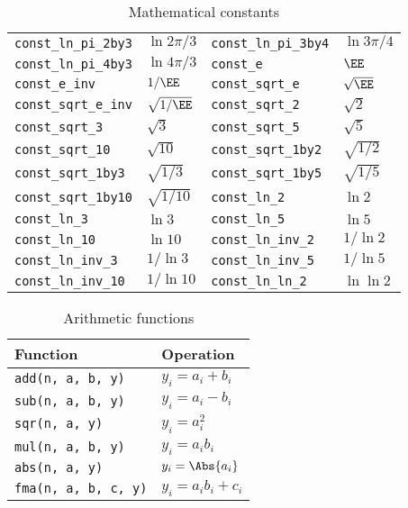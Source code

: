 \begin{table}
\begin{tabularx}{\textwidth}{p{1.2in}Lp{1.2in}L}
    \texttt{const\_ln\_pi\_2by3}   & $\ln{2\pi/3}$   &
    \texttt{const\_ln\_pi\_3by4}   & $\ln{3\pi/4}$   \\
    \texttt{const\_ln\_pi\_4by3}   & $\ln{4\pi/3}$   &
    \texttt{const\_e}              & $\EE$           \\
    \texttt{const\_e\_inv}         & $1/\EE$         &
    \texttt{const\_sqrt\_e}        & $\sqrt{\EE}$    \\
    \texttt{const\_sqrt\_e\_inv}   & $\sqrt{1/\EE}$  &
    \texttt{const\_sqrt\_2}        & $\sqrt{2}$      \\
    \texttt{const\_sqrt\_3}        & $\sqrt{3}$      &
    \texttt{const\_sqrt\_5}        & $\sqrt{5}$      \\
    \texttt{const\_sqrt\_10}       & $\sqrt{10}$     &
    \texttt{const\_sqrt\_1by2}     & $\sqrt{1/2}$    \\
    \texttt{const\_sqrt\_1by3}     & $\sqrt{1/3}$    &
    \texttt{const\_sqrt\_1by5}     & $\sqrt{1/5}$    \\
    \texttt{const\_sqrt\_1by10}    & $\sqrt{1/10}$   &
    \texttt{const\_ln\_2}          & $\ln{2}$        \\
    \texttt{const\_ln\_3}          & $\ln{3}$        &
    \texttt{const\_ln\_5}          & $\ln{5}$        \\
    \texttt{const\_ln\_10}         & $\ln{10}$       &
    \texttt{const\_ln\_inv\_2}     & $1/\ln{2}$      \\
    \texttt{const\_ln\_inv\_3}     & $1/\ln{3}$      &
    \texttt{const\_ln\_inv\_5}     & $1/\ln{5}$      \\
    \texttt{const\_ln\_inv\_10}    & $1/\ln{10}$     &
    \texttt{const\_ln\_ln\_2}      & $\ln\ln{2}$     \\
    \bottomrule
  \end{tabularx}
  \caption{Mathematical constants}
  \label{tab:Mathematical constants}
\end{table}

\begin{table}
  \begin{tabularx}{\textwidth}{LL}
    \toprule
    Function & Operation \\
    \midrule
    \texttt{add(n, a, b, y)}    & $y_i = a_i + b_i$     \\
    \texttt{sub(n, a, b, y)}    & $y_i = a_i - b_i$     \\
    \texttt{sqr(n, a, y)}       & $y_i = a_i^2$         \\
    \texttt{mul(n, a, b, y)}    & $y_i = a_i b_i$       \\
    \texttt{abs(n, a, y)}       & $y_i = \Abs{a_i}$     \\
    \texttt{fma(n, a, b, c, y)} & $y_i = a_i b_i + c_i$ \\
    \bottomrule
  \end{tabularx}
  \caption{Arithmetic functions}
  \label{tab:Arithmetic functions}
\end{table}

